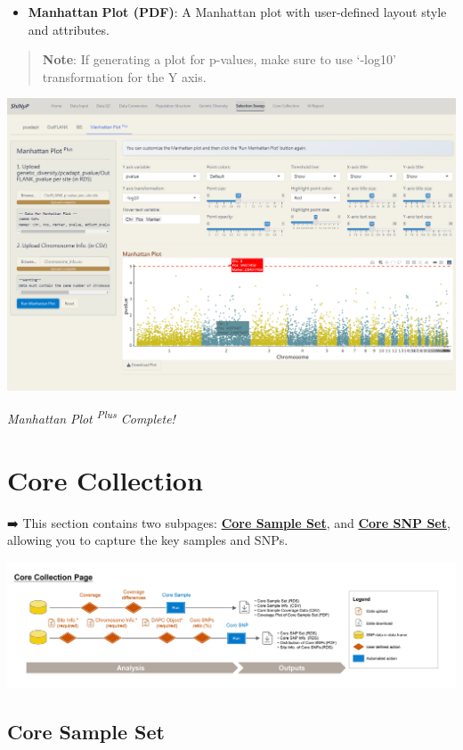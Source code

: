 \documentclass[
]{book}
\providecommand{\tightlist}{%
  \setlength{\itemsep}{0pt}\setlength{\parskip}{0pt}}
\begin{document}
\begin{itemize}
\tightlist
\item
  \textbf{Manhattan} \textbf{Plot (PDF)}: A Manhattan plot with user-defined layout style and attributes.
\end{itemize}

\begin{quote}
\textbf{Note}: If generating a plot for p-values, make sure to use `-log10' transformation for the Y axis.
\end{quote}

\includegraphics{images/clipboard-2598995324.png}

\emph{Manhattan} \emph{Plot \textsuperscript{Plus} Complete!}

\chapter{Core Collection}\label{sec-core-collection}

➡️ This section contains two subpages: \ul{\textbf{Core Sample Set}}, and \ul{\textbf{Core SNP Set}}, allowing you to capture the key samples and SNPs.

\includegraphics{images/Supp. Fig. 1-5_頁面_5.jpg}

\section{Core Sample Set}\label{core-sample-set}
\end{document}
